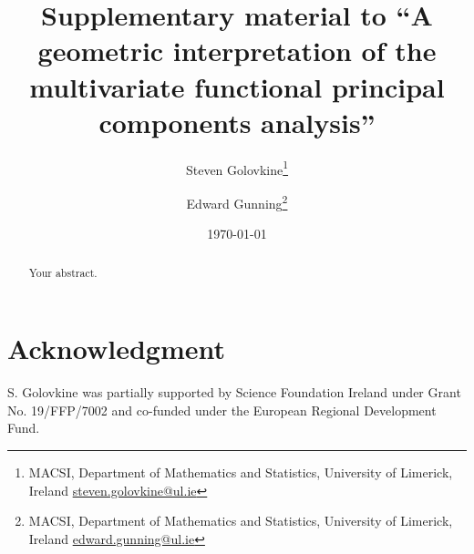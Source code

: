 \documentclass{article}
\title{Supplementary material to ``A geometric interpretation of the multivariate functional principal components analysis''}
\author{%
Steven Golovkine\thanks{MACSI, Department of Mathematics and Statistics, University of Limerick, Ireland \href{mailto:steven.golovkine@ul.ie}{steven.golovkine@ul.ie}}
\and
Edward Gunning\thanks{MACSI, Department of Mathematics and Statistics, University of Limerick, Ireland \href{mailto:edward.gunning@ul.ie}{edward.gunning@ul.ie}}
}
\date{\today}
\newcounter{th}
\begin{document}
\maketitle

\begin{abstract}
Your abstract.
\end{abstract}





\section*{Acknowledgment}

S. Golovkine was partially supported by Science Foundation Ireland under Grant No. 19/FFP/7002 and co-funded under the European Regional Development Fund.




\end{document}
